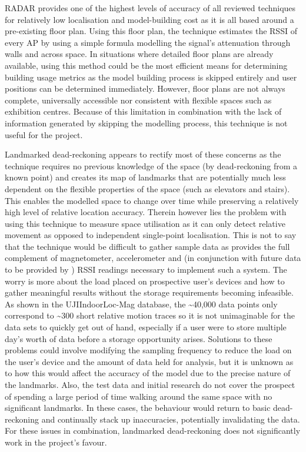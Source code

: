 \documentclass{UoYCSproject}
\begin{document}
        RADAR provides one of the highest levels of accuracy of all reviewed techniques for relatively low localisation and model-building cost as it is all based around a pre-existing floor plan. Using this floor plan, the technique estimates the RSSI of every AP by using a simple formula modelling the signal's attenuation through walls and across space. In situations where detailed floor plans are already available, using this method could be the most efficient means for determining building usage metrics as the model building process is skipped entirely and user positions can be determined immediately. However, floor plans are not always complete, universally accessible nor consistent with flexible spaces such as exhibition centres. Because of this limitation in combination with the lack of information generated by skipping the modelling process, this technique is not useful for the project.
        
        Landmarked dead-reckoning appears to rectify most of these concerns as the technique requires no previous knowledge of the space (by dead-reckoning from a known point) and creates its map of landmarks that are potentially much less dependent on the flexible properties of the space (such as elevators and stairs). This enables the modelled space to change over time while preserving a relatively high level of relative location accuracy. Therein however lies the problem with using this technique to measure space utilisation as it can only detect relative movement as opposed to independent single-point localisation. This is not to say that the technique would be difficult to gather sample data as \citet{torres2015ujiindoorlocmag} provides the full complement of magnetometer, accelerometer and (in conjunction with future data to be provided by \citet{JoaquinEmail}) RSSI readings necessary to implement such a system. The worry is more about the load placed on prospective user's devices and how to gather meaningful results without the storage requirements becoming infeasible. As shown in the UJIIndoorLoc-Mag database, the \textasciitilde40,000 data points only correspond to \textasciitilde300 short relative motion traces so it is not unimaginable for the data sets to quickly get out of hand, especially if a user were to store multiple day's worth of data before a storage opportunity arises. Solutions to these problems could involve modifying the sampling frequency to reduce the load on the user's device and the amount of data held for analysis, but it is unknown as to how this would affect the accuracy of the model due to the precise nature of the landmarks. Also, the test data and initial research do not cover the prospect of spending a large period of time walking around the same space with no significant landmarks. In these cases, the behaviour would return to basic dead-reckoning and continually stack up inaccuracies, potentially invalidating the data. For these issues in combination, landmarked dead-reckoning does not significantly work in the project's favour.
        
\end{document}
